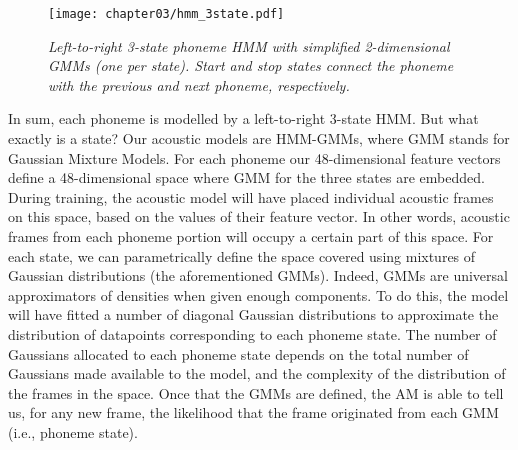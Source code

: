 \begin{figure}[htb]
\centering
\texttt{[image: chapter03/hmm\_3state.pdf]}
\caption{\textit{Left-to-right 3-state phoneme HMM with simplified 2-dimensional GMMs (one per state). Start and stop states connect the phoneme with the previous and next phoneme, respectively.}}
\label{fig:hmm_3state}
\end{figure}

In sum, each phoneme is modelled by a left-to-right 3-state HMM. But what exactly is a state? Our acoustic models are HMM-GMMs, where GMM stands for Gaussian Mixture Models. For each phoneme our 48-dimensional feature vectors define a 48-dimensional space where GMM for the three states are embedded. During training, the acoustic model will have placed individual acoustic frames on this space, based on the values of their feature vector. In other words, acoustic frames from each phoneme portion will occupy a certain part of this space. For each state, we can parametrically define the space covered using mixtures of Gaussian distributions (the aforementioned GMMs). Indeed, GMMs are universal approximators of densities when given enough components. To do this, the model will have fitted a number of diagonal Gaussian distributions to approximate the distribution of datapoints corresponding to each phoneme state. The number of Gaussians allocated to each phoneme state depends on the total number of Gaussians made available to the model, and the complexity of the distribution of the frames in the space. Once that the GMMs are defined, the AM is able to tell us, for any new frame, the likelihood that the frame originated from each GMM (i.e., phoneme state).  \\     


